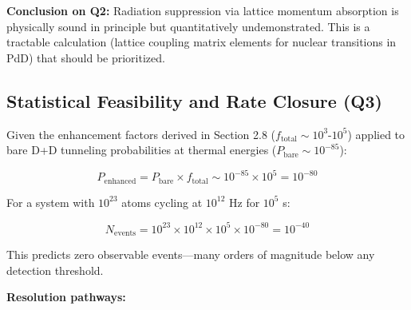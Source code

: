 \documentclass[11pt,a4paper]{article}
\begin{document}
\textbf{Conclusion on Q2:} Radiation suppression via lattice momentum absorption is physically sound in principle but quantitatively undemonstrated. This is a tractable calculation (lattice coupling matrix elements for nuclear transitions in PdD) that should be prioritized.

\subsection{Statistical Feasibility and Rate Closure (Q3)}

Given the enhancement factors derived in Section 2.8 ($f_{\text{total}} \sim 10^3\text{-}10^5$) applied to bare D+D tunneling probabilities at thermal energies ($P_{\text{bare}} \sim 10^{-85}$):

\begin{equation}
P_{\text{enhanced}} = P_{\text{bare}} \times f_{\text{total}} \sim 10^{-85} \times 10^5 = 10^{-80}
\end{equation}

For a system with $10^{23}$ atoms cycling at $10^{12}$ Hz for $10^5$ s:

\begin{equation}
N_{\text{events}} = 10^{23} \times 10^{12} \times 10^5 \times 10^{-80} = 10^{-40}
\end{equation}

This predicts zero observable events---many orders of magnitude below any detection threshold.

\textbf{Resolution pathways:}
\end{document}

